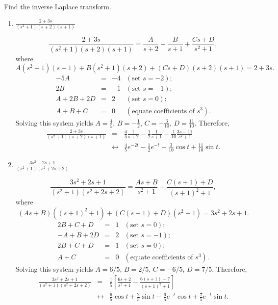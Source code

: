 \documentclass{ximera}
\begin{document}
\begin{problem}\label{exer:8.2.4}
 Find the inverse Laplace transform.

\begin{enumerate}
    \item $\frac{2+3s}{(s^2+1)(s+2)(s+1)}$

\begin{solution}
$$
\frac{2+3s}{(s^2+1)(s+2)(s+1)}=
\frac{A}{s+2}+\frac{B}{s+1}+\frac{Cs+D}{s^2+1},
$$
where
$$
A(s^2+1)(s+1)+
B(s^2+1)(s+2)+(Cs+D)(s+2)(s+1)=2+3s.
$$
$$
\begin{array}{rcrl}
-5A&=&-4&(\mbox{set }s=-2);\\
2B&=&-1& (\mbox{set }s=-1);\\
A+2B+2D&=&2&(\mbox{set }s=0);\\
A+B+C&=&0&(\mbox{equate coefficients of }s^3).
\end{array}
$$
Solving this system yields $A=\frac{4}{5}$, $B=-\frac{1}{2}$,
$C=-\frac{3}{10}$, $D=\frac{11}{10}$. Therefore,
\begin{eqnarray*}
\frac{2+3s}{(s^2+1)(s+2)(s+1)}&=&
\frac{4}{5}\frac{1}{s+2}-\frac{1}{2}\frac{1}{s+1}-\frac{1}{10}\frac{3s-11}{s^2+1}\\
&\leftrightarrow&
\frac{4}{5}e^{-2t}-\frac{1}{2}e^{-t}-\frac{3}{10}\cos t
+\frac{11}{10}\sin t.
\end{eqnarray*}
\end{solution}

    \item $\frac{3s^2+2s+1}{(s^2+1)(s^2+2s+2)}$
\begin{solution}
$$
\frac{3s^2+2s+1}{(s^2+1)(s^2+2s+2)}=
\frac{As+B}{s^2+1}+\frac{C(s+1)+D}{(s+1)^2+1},
$$
where
$$
(As+B)((s+1)^2+1)+(C(s+1)+D)(s^2+1)=3s^2+2s+1.
$$
$$
\begin{array}{rcrl}
2B+C+D&=&1&(\mbox{set }s=0);\\
-A+B+2D&=&2& (\mbox{set }s=-1);\\
2B+C+D&=&1&(\mbox{set }s=0);\\
A+C&=&0&(\mbox{equate coefficients of }s^3).
\end{array}
$$
Solving this system yields
$A=6/5$, $B=2/5$, $C=-6/5$, $D=7/5$.
Therefore,
\begin{eqnarray*}
\frac{3s^2+2s+1}{(s^2+1)(s^2+2s+2)}&=&
\frac{1}{5}\left[\frac{6s+2}{s^2+1}-\frac{6(s+1)-7}{(s+1)^2+1}\right]\\
&\leftrightarrow&
 \frac{6}{5}\cos t+\frac{2}{5}\sin t
-\frac{6}{5}e^{-t}\cos t+\frac{7}{5}e^{-t}\sin t.
\end{eqnarray*}
\end{solution}


\end{enumerate}
\end{problem}
\end{document}

